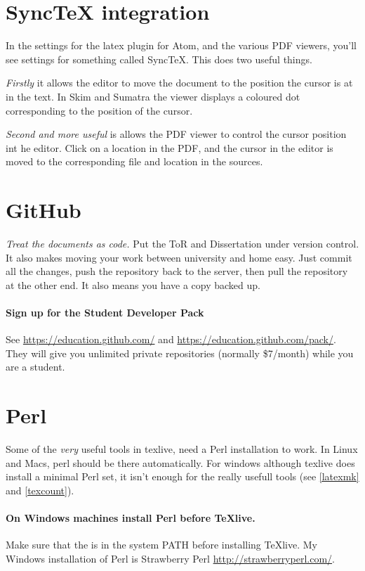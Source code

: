 \section{SyncTeX integration}
In the settings for the latex plugin for Atom, and the various PDF viewers, you'll see settings for something called SyncTeX.  This does two useful things.

\emph{Firstly} it allows the editor to move the document to the position the cursor is at in the text.  In Skim and Sumatra the viewer displays a coloured dot corresponding to the position of the cursor.

\emph{Second and more useful} is allows the PDF viewer to control the cursor position int he editor.  Click on a location in the PDF, and the cursor in the editor is moved to the corresponding file and location in the sources.

\section{GitHub}
\emph{Treat the documents as code.}
Put the ToR and Dissertation under version control.  It also makes moving your work between university and home easy.  Just commit all the changes, push the repository back to the server, then pull the repository at the other end.  It also means you have a copy backed up.

\paragraph{Sign up for the Student Developer Pack} See \url{https://education.github.com/} and \url{https://education.github.com/pack/}.  They will give you unlimited private repositories (normally \$7/month) while you are a student.

\section{Perl}\label{perl}
Some of the \emph{very} useful tools in texlive, need a Perl installation to work.   In Linux and Macs, perl should be there automatically.  For windows although texlive does install a minimal Perl set, it isn't enough for the really usefull tools (see \ref{latexmk} and \ref{texcount}).

\paragraph{On Windows machines install Perl before TeXlive.}
Make sure that the  is in the system PATH before installing TeXlive.   My Windows installation of Perl is Strawberry Perl \url{http://strawberryperl.com/}.


